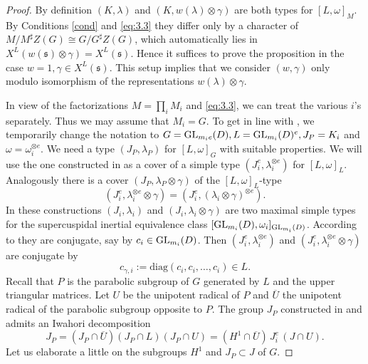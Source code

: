 \documentclass[11pt]{amsart}
\theoremstyle{definition}
\begin{document}
\begin{proof}
By definition $(K,\lambda)$ and $(K,w(\lambda) \otimes \gamma)$ are both types for
$[L,\omega]_M$. By Conditions \ref{cond} and \eqref{eq:3.3} they differ only by a character
of $M / M^\sharp Z(G) \cong G / G^\sharp Z(G)$, which automatically lies in
$X^L (w({{\mathfrak s}}) \otimes \gamma) = X^L ({{\mathfrak s}})$. Hence it suffices to prove the proposition in
the case $w = 1, \gamma \in X^L ({{\mathfrak s}})$. This setup implies that we consider $(w,\gamma)$
only modulo isomorphism of the representations $w(\lambda) \otimes \gamma$.

In view of the factorizations $M = \prod_i M_i$ and \eqref{eq:3.3}, we can treat
the various $i$'s separately. Thus we may assume that $M_i = G$. 
To get in line with \cite{Sec3}, we temporarily change 
the notation to $G = {{\rm GL}}_{m_i e}(D), L = {{\rm GL}}_{m_i} (D)^e, J_P = K_i$ and $\omega = 
\omega_i^{\otimes e}$. We need a type $(J_P,\lambda_P)$ for $[L,\omega]_G$ with suitable
properties. We will use the one constructed in \cite{Sec3} as a cover of a simple type 
$(J_i^e ,\lambda_i^{\otimes e})$ for $[L,\omega]_L$. Analogously there is a cover 
$(J_P,\lambda_P \otimes \gamma)$ of the $[L,\omega]_L$-type \label{i:29}
\[
(J_i^e,\lambda_i^{\otimes e} \otimes \gamma) = 
(J_i^e, (\lambda_i \otimes \gamma)^{\otimes e}) .
\]
In these constructions $(J_i,\lambda_i)$ and $(J_i,\lambda_i \otimes \gamma)$ are two
maximal simple types for the supercuspidal inertial equivalence class 
$[{{\rm GL}}_{m_i} (D),\omega_i]_{{{\rm GL}}_{m_i} (D)}$. According to
\cite[Corollary 7.3]{SeSt6} they are conjugate, say by $c_i \in {{\rm GL}}_{m_i} (D)$.
Then $(J_i^e,\lambda_i^{\otimes e})$ and $(J_i^e,\lambda_i^{\otimes e} \otimes \gamma)$
are conjugate by
\begin{equation*}
c_{\gamma,i} := \text{diag}(c_i,c_i,\ldots,c_i) \in L .
\end{equation*}
Recall that $P$ is the parabolic subgroup of $G$ generated by $L$ and the upper 
triangular matrices. Let $U$ be the unipotent radical of $P$ and $\overline{U}$ the
unipotent radical of the parabolic subgroup opposite to $P$. The group $J_P$
constructed in \cite[\S 5.2]{Sec3} and \cite[\S 5.5]{SeSt4} admits an Iwahori 
decomposition
\begin{equation}\label{eq:3.8}
J_P = (J_P \cap \overline{U}) (J_P \cap L) (J_P \cap U) =
(H^1 \cap \overline{U}) \, J_i^e \, (J \cap U) . 
\end{equation}
Let us elaborate a little on the subgroups $H^1$ and $J_P \subset J$ of $G$. 

\end{proof}
\end{document}

